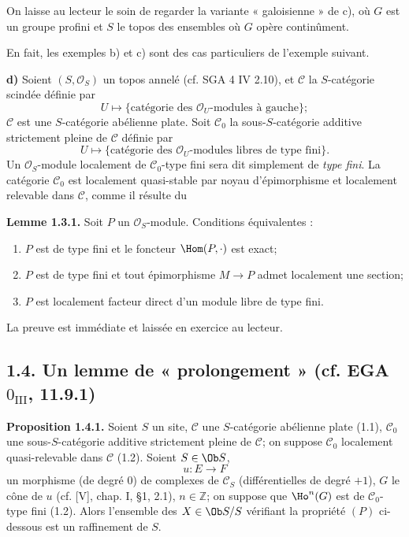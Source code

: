 \documentclass[11pt]{article}
\begin{document}
On laisse au lecteur le soin de regarder la variante « galoisienne » de c), où \(G\) est un groupe profini et \(S\) le topos des ensembles où \(G\) opère continûment.

En fait, les exemples b) et c) sont des cas particuliers de l'exemple suivant.

\textbf{d)} Soient \((S,\mathcal O_S)\) un topos annelé (cf. SGA 4 IV 2.10), et \(\mathcal C\) la \(S\)-catégorie scindée définie par
\[
  U\longmapsto\{\text{catégorie des }\mathcal O_U\text{-modules à gauche}\};
\]
\(\mathcal C\) est une \(S\)-catégorie abélienne plate. Soit \(\mathcal C_0\) la sous-\(S\)-catégorie additive strictement pleine de \(\mathcal C\) définie par
\[
  U\longmapsto\{\text{catégorie des }\mathcal O_U\text{-modules libres de type fini}\}.
\]
Un \(\mathcal O_S\)-module localement de \(\mathcal C_0\)-type fini sera dit simplement de \emph{type fini}. La catégorie \(\mathcal C_0\) est localement quasi-stable par noyau d'épimorphisme et localement relevable dans \(\mathcal C\), comme il résulte du

\textbf{Lemme 1.3.1.} Soit \(P\) un \(\mathcal O_S\)-module. Conditions équivalentes :
\begin{enumerate}[label=(\roman*)]
\item \(P\) est de type fini et le foncteur \(\Hom(P,\cdot)\) est exact;
\item \(P\) est de type fini et tout épimorphisme \(M\to P\) admet localement une section;
\item \(P\) est localement facteur direct d'un module libre de type fini.
\end{enumerate}
La preuve est immédiate et laissée en exercice au lecteur.

\subsection*{1.4. Un lemme de « prolongement » (cf. EGA \(0_{\mathrm{III}}\), 11.9.1)}

\textbf{Proposition 1.4.1.} Soient \(S\) un site, \(\mathcal C\) une \(S\)-catégorie abélienne plate (1.1), \(\mathcal C_0\) une sous-\(S\)-catégorie additive strictement pleine de \(\mathcal C\); on suppose \(\mathcal C_0\) localement quasi-relevable dans \(\mathcal C\) (1.2). Soient \(S\in\Ob S\),
\[
  u:E\longrightarrow F
\]
un morphisme (de degré \(0\)) de complexes de \(\mathcal C_S\) (différentielles de degré \(+1\)), \(G\) le cône de \(u\) (cf. [V], chap. I, §1, 2.1), \(n\in\mathbb Z\); on suppose que \(\Ho^n(G)\) est de \(\mathcal C_0\)-type fini (1.2). Alors l'ensemble des \(X\in\Ob S/S\) vérifiant la propriété \((P)\) ci-dessous est un raffinement de \(S\).
\end{document}
